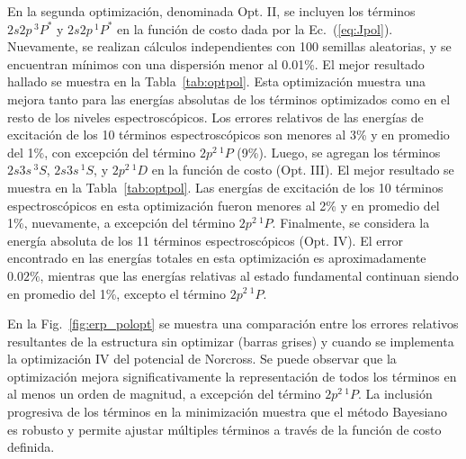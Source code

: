 En la segunda optimización, denominada Opt. II, se incluyen los términos 
$2s2p\,^3P^*$ y $2s2p\,^1P^*$ en la función de costo dada por la 
Ec.~(\ref{eq:Jpol}). Nuevamente, se realizan cálculos independientes con 
100 semillas aleatorias, y se encuentran mínimos con una dispersión 
menor al 0.01\%. El mejor resultado hallado se muestra en la 
Tabla~\ref{tab:optpol}. Esta optimización muestra una mejora tanto para 
las energías absolutas de los términos optimizados como en el resto de 
los niveles espectroscópicos. Los errores relativos de las energías de 
excitación de los 10 términos espectroscópicos son menores al 3\% y 
en promedio del 1\%, con excepción del término $2p^2\,^1P$ (9\%). 
Luego, se agregan los términos $2s3s\,^3S$, $2s3s\,^1S$, y $2p^2\,^1D$ 
en la función de costo (Opt. III). El mejor resultado se muestra en 
la Tabla~\ref{tab:optpol}. Las energías de excitación de los 10 términos 
espectroscópicos en esta optimización fueron menores al 2\% y en 
promedio del 1\%, nuevamente, a excepción del término $2p^2\,^1P$. 
Finalmente, se considera la energía absoluta de los 11 términos 
espectroscópicos (Opt. IV). El error encontrado en las energías totales
en esta optimización es aproximadamente $0.02\%$, mientras que las 
energías relativas al estado fundamental continuan siendo en promedio 
del 1\%, excepto el término $2p^2\,^1P$. 

En la Fig.~\ref{fig:erp_polopt} se muestra una comparación entre los 
errores relativos resultantes de la estructura sin optimizar (barras 
grises) y cuando se implementa la optimización IV del potencial de 
Norcross. Se puede observar que la optimización mejora 
significativamente la representación de todos los términos en al menos
un orden de magnitud, a excepción del término $2p^2\,^1P$. La inclusión
progresiva de los términos en la minimización muestra que el método 
Bayesiano es robusto y permite ajustar múltiples términos a través de 
la función de costo definida.


